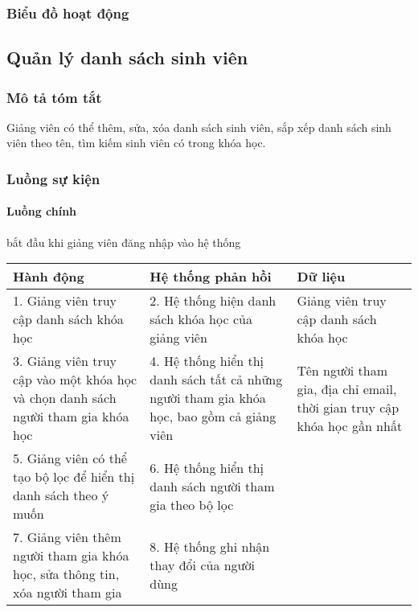 \documentclass[./../main_file.tex]{subfiles}
\begin{document}
\subsubsection{Biểu đồ hoạt động}


\subsection{Quản lý danh sách sinh viên}
\subsubsection{Mô tả tóm tắt}
Giảng viên có thể thêm, sửa, xóa danh sách sinh viên, sắp xếp danh sách sinh viên theo tên, tìm kiếm sinh viên có trong khóa học.

\subsubsection{Luồng sự kiện}
\paragraph{Luồng chính}
bắt đầu khi giảng viên đăng nhập vào hệ thống
\begin{table}[H]
				\begin{tabular}{|p{.33\textwidth}|p{}|p{}|}
		\hline
		\textbf{Hành động}                                                         & \textbf{Hệ thống phản hồi}                             & \textbf{Dữ liệu} \\ \hline
		1. Giảng viên truy cập danh sách khóa học & 2. Hệ thống hiện danh sách khóa học của giảng viên & Giảng viên truy cập danh sách khóa học \\ \hline
		3. Giảng viên truy cập vào một khóa học và chọn danh sách người tham gia khóa học &
		4. Hệ thống hiển thị danh sách tất cả những người tham gia khóa học, bao gồm cả giảng viên &
		Tên người tham gia, địa chỉ email, thời gian truy cập khóa học gần nhất \\ \hline
		5. Giảng viên có thể tạo bộ lọc để hiển thị danh sách theo ý muốn             & 6. Hệ thống hiển thị danh sách người tham gia theo bộ lọc &                  \\ \hline
		7. Giảng viên thêm người tham gia khóa học, sửa thông tin, xóa người tham gia & 8. Hệ thống ghi nhận thay đổi của người dùng              &                  \\ \hline
	\end{tabular}
\end{table}
\end{document}
